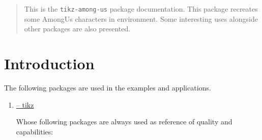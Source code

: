 \documentclass[12pt]{article}
\newenvironment{FHZtcbEnumerate}{%
  \begin{FHZboxEnumerateStyle}\begin{enumerate}}
    {\end{enumerate}\end{FHZboxEnumerateStyle}
}
\begin{document}
{\FHZCapaArticleCabecalho}

\begin{abstract}
  \begin{FHZboxEnumerateStyle}
    This is the \texttt{tikz-among-us} package documentation. This package recreates some AmongUs characters in {\TikZ} environment. Some interesting uses alongside other packages are also presented.
  \end{FHZboxEnumerateStyle}
\end{abstract}

\begin{FHZboxEnumerateStyle}
  \begin{multicols}{2}
    {\small \tableofcontents}
  \end{multicols}
\end{FHZboxEnumerateStyle}
\section{Introduction}

The following packages are used in the examples and applications.
\begin{FHZtcbEnumerate}
  \item \href{https://www.ctan.org/pkg/tikz}{{\CTAN} -- tikz}

  Whose following packages are always used as reference of quality and capabilities:
  \begin{enumerate}
  \end{enumerate}
\end{FHZtcbEnumerate}
\end{document}
